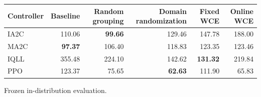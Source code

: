 \begin{tabular}{lrrrrr}
\hline
Controller & Baseline & Random grouping & Domain randomization & Fixed WCE & Online WCE \\
\hline
IA2C & 110.06 & \textbf{99.66} & 129.46 & 147.78 & 188.00 \\
MA2C & \textbf{97.37} & 106.40 & 118.83 & 123.35 & 123.46 \\
IQLL & 355.48 & 224.10 & 142.62 & \textbf{131.32} & 219.84 \\
PPO & 123.37 & 75.65 & \textbf{62.63} & 111.90 & 65.83 \\
\hline
\end{tabular}
Frozen in-distribution evaluation.
